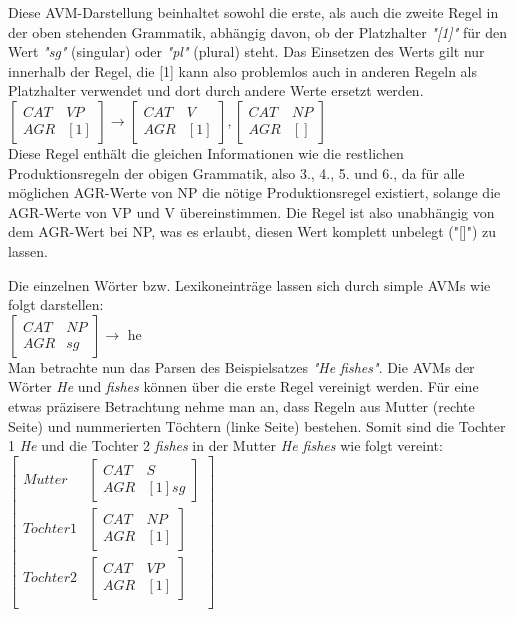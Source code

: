 \documentclass[12pt]{report}
\begin{document}
Diese AVM-Darstellung beinhaltet sowohl die erste, als auch die zweite Regel in der oben stehenden Grammatik, abhängig davon, ob der Platzhalter \textit{"[1]"} für den Wert \textit{"sg"} (singular) oder \textit{"pl"} (plural) steht. Das Einsetzen des Werts gilt nur innerhalb der Regel, die [1] kann also problemlos auch in anderen Regeln als Platzhalter verwendet und dort durch andere Werte ersetzt werden.\\

$\begin{bmatrix} 
CAT & VP \\
AGR & [1]
\end{bmatrix} 
\rightarrow
\begin{bmatrix} 
CAT & V \\
AGR & [1]
\end{bmatrix},
\begin{bmatrix} 
CAT & NP \\
AGR & [] 
\end{bmatrix}$ \\

Diese Regel enthält die gleichen Informationen wie die restlichen Produktionsregeln der obigen Grammatik, also 3., 4., 5. und 6., da für alle möglichen AGR-Werte von NP die nötige Produktionsregel existiert, solange die AGR-Werte von VP und V übereinstimmen. Die Regel ist also unabhängig von dem AGR-Wert bei NP, was es erlaubt, diesen Wert komplett unbelegt ("[]") zu lassen.

Die einzelnen Wörter bzw. Lexikoneinträge lassen sich durch simple AVMs wie folgt darstellen:\\

$\begin{bmatrix} 
CAT & NP \\
AGR & sg
\end{bmatrix}\rightarrow$ he \\

Man betrachte nun das Parsen des Beispielsatzes \textit{"He fishes"}. Die AVMs der Wörter \textit{He} und \textit{fishes} können über die erste Regel vereinigt werden. Für eine etwas präzisere Betrachtung nehme man an, dass Regeln aus Mutter (rechte Seite) und nummerierten Töchtern (linke Seite) bestehen. Somit sind die Tochter 1 \textit{He} und die Tochter 2 \textit{fishes} in der Mutter \textit{He fishes} wie folgt vereint:\\

$\begin{bmatrix} 
Mutter & \begin{bmatrix} 
CAT & S \\
AGR & [1] sg
\end{bmatrix} \\
Tochter 1 & \begin{bmatrix} 
CAT & NP \\
AGR & [1]
\end{bmatrix} \\
Tochter 2 & \begin{bmatrix} 
CAT & VP \\
AGR & [1]
\end{bmatrix}\\
\end{bmatrix}$\\
\end{document}
